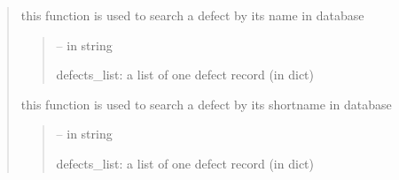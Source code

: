 \documentclass[letterpaper,10pt,english]{sphinxmanual}
\begin{document}
\begin{quote}
\begin{savenotes}
\begin{fulllineitems}

\begin{savenotes}\begin{fulllineitems}
\label{\detokenize{setting/database_utils:oxin.database_utils.dataBaseUtils.search_defect_by_name}}
\pysigstartsignatures
{}
\pysigstopsignatures
\sphinxAtStartPar
this function is used to search a defect by its name in database
\begin{quote}\begin{description}
\sphinxAtStartPar
{} – in string

\sphinxAtStartPar
defects\_list: a list of one defect record (in dict)

\end{description}\end{quote}

\end{fulllineitems}\end{savenotes}


\begin{savenotes}\begin{fulllineitems}
\label{\detokenize{setting/database_utils:oxin.database_utils.dataBaseUtils.search_defect_by_short_name}}
\pysigstartsignatures
{}
\pysigstopsignatures
\sphinxAtStartPar
this function is used to search a defect by its short\sphinxhyphen{}name in database
\begin{quote}\begin{description}
\sphinxAtStartPar
{} – in string

\sphinxAtStartPar
defects\_list: a list of one defect record (in dict)

\end{description}\end{quote}


\end{fulllineitems}
\end{savenotes}
\end{fulllineitems}
\end{savenotes}
\end{quote}
\end{document}
